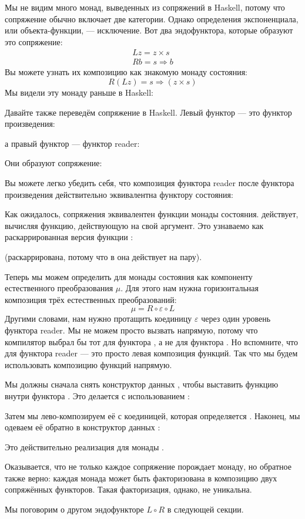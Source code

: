 Мы не видим много монад, выведенных из сопряжений в Haskell,
потому что сопряжение обычно включает две категории. Однако
определения экспоненциала, или объекта-функции, --- исключение.
Вот два эндофунктора, которые образуют это сопряжение:
\begin{gather*}
  L z = z\times{}s \\
  R b = s \Rightarrow b
\end{gather*}
Вы можете узнать их композицию как знакомую монаду состояния:
\[R (L z) = s \Rightarrow (z\times{}s)\]
Мы видели эту монаду раньше в Haskell:

Давайте также переведём сопряжение в Haskell. Левый функтор --- это
функтор произведения:

а правый функтор --- функтор reader:

Они образуют сопряжение:

Вы можете легко убедить себя, что композиция функтора
reader после функтора произведения действительно эквивалентна функтору
состояния:

Как ожидалось,  сопряжения эквивалентен
функции  монады состояния.  действует,
вычисляя функцию, действующую на свой аргумент. Это узнаваемо как
раскаррированная версия функции :

(раскаррирована, потому что в  она действует на пару).

Теперь мы можем определить  для монады состояния как компоненту
естественного преобразования $\mu$. Для этого нам нужна горизонтальная композиция
трёх естественных преобразований:
\[\mu = R \circ \varepsilon \circ L\]
Другими словами, нам нужно протащить коединицу $\varepsilon$ через один уровень
функтора reader. Мы не можем просто вызвать  напрямую, потому что
компилятор выбрал бы тот для функтора , а не для
функтора . Но вспомните, что  для
функтора reader --- это просто левая композиция функций. Так что мы будем использовать композицию функций
напрямую.

Мы должны сначала снять конструктор данных , чтобы выставить
функцию внутри функтора . Это делается с использованием
:

Затем мы лево-композируем её с коединицей, которая определяется
. Наконец, мы одеваем её обратно в
конструктор данных :

Это действительно реализация  для
монады .

Оказывается, что не только каждое сопряжение порождает монаду, но
обратное также верно: каждая монада может быть факторизована в
композицию двух сопряжённых функторов. Такая факторизация, однако, не уникальна.

Мы поговорим о другом эндофункторе $L \circ R$ в следующей
секции.
